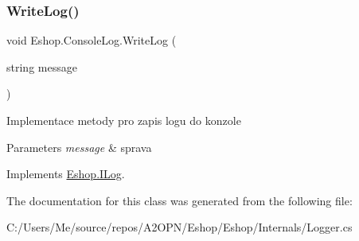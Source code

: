 \subsubsection{\texorpdfstring{WriteLog()}{WriteLog()}}
{\footnotesize\ttfamily void Eshop.\+Console\+Log.\+Write\+Log (\begin{DoxyParamCaption}\item[{string}]{message }\end{DoxyParamCaption})}



Implementace metody pro zapis logu do konzole 


\begin{DoxyParams}{Parameters}
{\em message} & sprava\\
\hline
\end{DoxyParams}


Implements \mbox{\hyperlink{interface_eshop_1_1_i_log}{Eshop.\+I\+Log}}.



The documentation for this class was generated from the following file\+:\begin{DoxyCompactItemize}
\item 
C\+:/\+Users/\+Me/source/repos/\+A2\+O\+P\+N/\+Eshop/\+Eshop/\+Internals/Logger.\+cs\end{DoxyCompactItemize}
